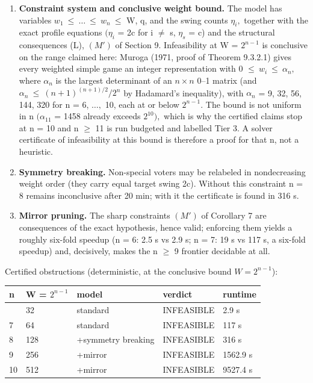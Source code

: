 \documentclass[
]{article}
\newcounter{none} %
\providecommand{\tightlist}{%
  \setlength{\itemsep}{0pt}\setlength{\parskip}{0pt}}
\begin{document}
\begin{enumerate}
\def\labelenumi{\arabic{enumi}.}
\tightlist
\item
  \textbf{Constraint system and conclusive weight bound.} The model has
  variables \(w_1\ \le\ \dots\ \le\ w_n\ \le\) W, q, and the swing
  counts \(\eta_i,\) together with the exact profile equations
  \((\eta_i\) = 2c for i \(\ne\) s, \(\eta_s\) = c) and the structural
  consequences (L), \((M')\) of Section 9. Infeasibility at W =
  \(2^{n-1}\) is conclusive on the range claimed here: Muroga (1971,
  proof of Theorem 9.3.2.1) gives every weighted simple game an integer
  representation with 0 \(\le\ w_i\ \le\ \alpha_n,\) where \(\alpha_n\)
  is the largest determinant of an \(n\times n\) 0--1 matrix (and
  \(\alpha_n\ \le\ (n+1)^{(n+1)/2}/2^n\) by Hadamard's inequality), with
  \(\alpha_n\) = 9, 32, 56, 144, 320 for n = 6, \(\dots,\) 10, each at
  or below \(2^{n-1}.\) The bound is not uniform in n \((\alpha_{11}\) =
  1458 already exceeds \(2^10),\) which is why the certified claims stop
  at n = 10 and n \(\ge\) 11 is run budgeted and labelled Tier 3. A
  solver certificate of infeasibility at this bound is therefore a proof
  for that n, not a heuristic.
\item
  \textbf{Symmetry breaking.} Non-special voters may be relabeled in
  nondecreasing weight order (they carry equal target swing 2c). Without
  this constraint n = 8 remains inconclusive after 20 min; with it the
  certificate is found in 316 s.
\item
  \textbf{Mirror pruning.} The sharp constraints \((M')\) of Corollary 7
  are consequences of the exact hypothesis, hence valid; enforcing them
  yields a roughly six-fold speedup (n = 6: 2.5 s vs 2.9 s; n = 7: 19 s
  vs 117 s, a six-fold speedup) and, decisively, makes the n \(\ge\) 9
  frontier decidable at all.
\end{enumerate}

Certified obstructions (deterministic, at the conclusive bound
\(W = 2^{n-1}\)):

{\def\LTcaptype{none} %
\begin{longtable}[]{@{}lllll@{}}
\toprule\noalign{}
n & W = \(2^{n-1}\) & model & verdict & runtime \\
\midrule\noalign{}
\endhead
\bottomrule\noalign{}
\endlastfoot
6 & 32 & standard & INFEASIBLE & 2.9 s \\
7 & 64 & standard & INFEASIBLE & 117 s \\
8 & 128 & +symmetry breaking & INFEASIBLE & 316 s \\
9 & 256 & +mirror & INFEASIBLE & 1562.9 s \\
10 & 512 & +mirror & INFEASIBLE & 9527.4 s \\
\end{longtable}
}
\end{document}

